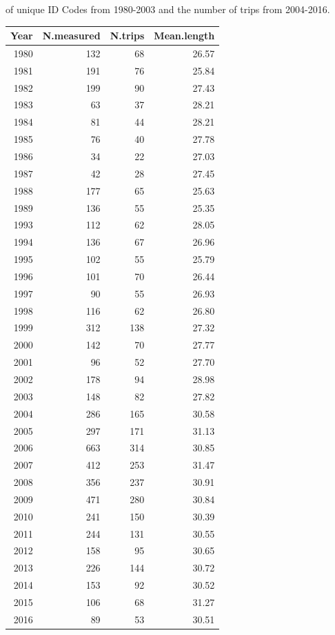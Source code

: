 \documentclass[12pt,]{article}
\begin{document}
\begin{table}[ht]
{                                            of unique ID Codes from 1980-2003 and the 
                                            number of trips from 2004-2016.} 
\label{tab:Fleet4_lengthsample}
\begin{tabular}{rrrr}
  \hline
Year & N.measured & N.trips & Mean.length \\ 
  \hline
1980 & 132 &  68 & 26.57 \\ 
  1981 & 191 &  76 & 25.84 \\ 
  1982 & 199 &  90 & 27.43 \\ 
  1983 &  63 &  37 & 28.21 \\ 
  1984 &  81 &  44 & 28.21 \\ 
  1985 &  76 &  40 & 27.78 \\ 
  1986 &  34 &  22 & 27.03 \\ 
  1987 &  42 &  28 & 27.45 \\ 
  1988 & 177 &  65 & 25.63 \\ 
  1989 & 136 &  55 & 25.35 \\ 
  1993 & 112 &  62 & 28.05 \\ 
  1994 & 136 &  67 & 26.96 \\ 
  1995 & 102 &  55 & 25.79 \\ 
  1996 & 101 &  70 & 26.44 \\ 
  1997 &  90 &  55 & 26.93 \\ 
  1998 & 116 &  62 & 26.80 \\ 
  1999 & 312 & 138 & 27.32 \\ 
  2000 & 142 &  70 & 27.77 \\ 
  2001 &  96 &  52 & 27.70 \\ 
  2002 & 178 &  94 & 28.98 \\ 
  2003 & 148 &  82 & 27.82 \\ 
  2004 & 286 & 165 & 30.58 \\ 
  2005 & 297 & 171 & 31.13 \\ 
  2006 & 663 & 314 & 30.85 \\ 
  2007 & 412 & 253 & 31.47 \\ 
  2008 & 356 & 237 & 30.91 \\ 
  2009 & 471 & 280 & 30.84 \\ 
  2010 & 241 & 150 & 30.39 \\ 
  2011 & 244 & 131 & 30.55 \\ 
  2012 & 158 &  95 & 30.65 \\ 
  2013 & 226 & 144 & 30.72 \\ 
  2014 & 153 &  92 & 30.52 \\ 
  2015 & 106 &  68 & 31.27 \\ 
  2016 &  89 &  53 & 30.51 \\ 
   \hline
\end{tabular}
\end{table}
\end{document}
